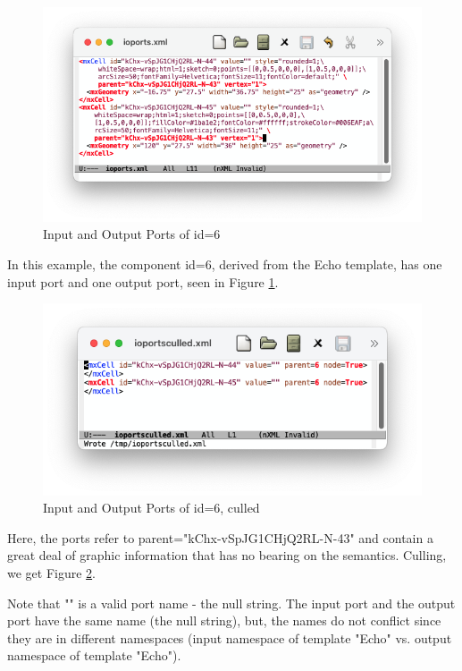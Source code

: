 \documentclass[10pt,anonymous,review]{acmart}
\begin{document}
\begin{figure}
    \includegraphics[trim=2cm 2cm 2cm 1.7cm, clip, scale=0.4]{./media/ioports.png}
    \caption{Input and Output Ports of id=6}
    \label{ioports}
\end{figure}
\vspace{1\baselineskip}
In this example, the component id=6, derived from the Echo template, has one input port and one output port, seen in Figure \ref{ioports}.

\begin{figure}
    \includegraphics[trim=2cm 2cm 2cm 1.7cm, clip, scale=0.37]{./media/ioportsculled.png}
    \caption{Input and Output Ports of id=6, culled}
    \label{ioportsculled}
\end{figure}
Here, the ports refer to parent="kChx-vSpJG1CHjQ2RL-N-43" and contain a great deal of graphic information that has no bearing on the semantics.
Culling, we get Figure \ref{ioportsculled}.

Note that "" is a valid port name - the null string. The input port and the output port have the same name (the null string), but, the names do not conflict since they are in different namespaces (input namespace of template "Echo" vs. output namespace of template "Echo").
\end{document}
